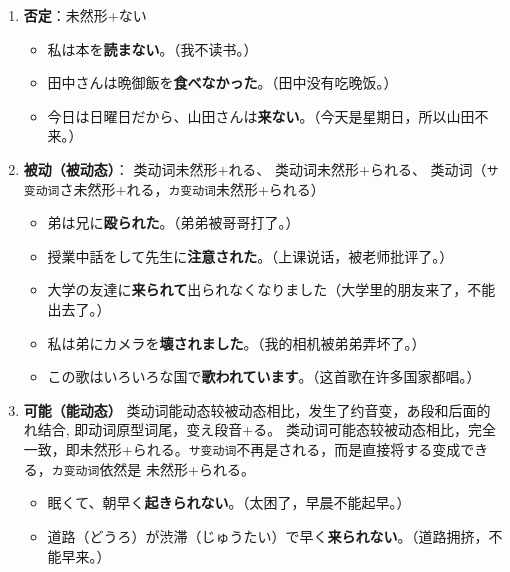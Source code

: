 \begin{enumerate}[A]
    \item {\bfseries 否定}：未然形+ない
        \begin{itemize}
            \item {\jp 私は本を{\bfseries 読まない}。}（我不读书。）
            \item {\jp 田中さんは晩御飯を{\bfseries 食べなかった}。}（田中没有吃晚饭。）
            \item {\jp 今日は日曜日だから、山田さんは{\bfseries 来ない}。}（今天是星期日，所以山田不来。）
        \end{itemize}
        \vspace{0.2in}
    \item {\bfseries 被动（被动态）}：{\uppercase\expandafter{} 类动词未然形$+$れる、\uppercase\expandafter{} 类动词未然形$+$られる、\uppercase\expandafter{} 类动词（{\texttt{サ变动词}}さ未然形$+$れる，\texttt{カ变动词}未然形+られる）}
        \begin{itemize}
            \item {\jp 弟は兄に{\bfseries 殴られた}。}（弟弟被哥哥打了。）
            \item {\jp 授業中話をして先生に{\bfseries 注意された}。}（上课说话，被老师批评了。）
            \item {\jp 大学の友達に{\bfseries 来られて}出られなくなりました}（大学里的朋友来了，不能出去了。）
            \item {\jp 私は弟にカメラを{\bfseries 壊されました}。}（我的相机被弟弟弄坏了。）
            \item {\jp この歌はいろいろな国で{\bfseries 歌われています}。}（这首歌在许多国家都唱。）
        \end{itemize}
        \vspace{0.2in}
    \item {\bfseries 可能（能动态）} \uppercase\expandafter{} 类动词能动态较被动态相比，发生了{\heiti 约音变}，あ段和后面的れ结合, 即动词原型词尾，变え段音+る。\uppercase\expandafter{} 类动词可能态较被动态相比，完全一致，即未然形+られる。{\texttt{サ变动词}}不再是される，而是直接将する变成できる，\texttt{カ变动词}依然是 未然形+られる。
    \begin{itemize} 
        \item {\jp 眠くて、朝早く{\bfseries 起きられない}。}（太困了，早晨不能起早。）
        \item {\jp 道路（どうろ）が渋滞（じゅうたい）で早く{\bfseries 来られない}。}（道路拥挤，不能早来。）

\end{itemize}
\end{enumerate}
